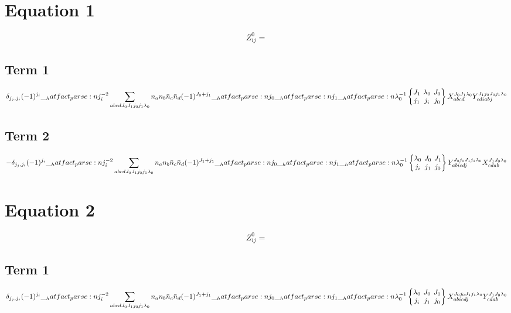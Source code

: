 \documentclass{scrartcl}
\newcommand{\sixj}[6]{\begingroup\setlength{\arraycolsep}{0.2em}\begin{Bmatrix} #1 & #2 & #3 \\ #4 & #5 & #6 \end{Bmatrix}\endgroup}
\begin{document}
\section{Equation 1}
\begin{dmath*}
Z_{i j}^{0} = 
\end{dmath*}
\subsection{Term 1}
\begin{dmath*}
\delta_{{j}_{j},{j}_{i}} \* (-1)^{{j}_{i}} \* \hatfact{{j}_{i}^{-2}} \* \sum_{a b c d {J}_{0} {J}_{1} {j}_{0} {j}_{1} {{\lambda}}_{0}} \* n_{a} \* n_{b} \* \bar{n}_{c} \* \bar{n}_{d} \* (-1)^{{J}_{0}+{j}_{1}} \* \hatfact{{j}_{0}} \* \hatfact{{j}_{1}} \* \hatfact{{{\lambda}}_{0}^{-1}} \* \sixj{{J}_{1}}{{{\lambda}}_{0}}{{J}_{0}}{{j}_{1}}{{j}_{i}}{{j}_{0}} \* X_{a b c d}^{{J}_{0} {J}_{1} {{\lambda}}_{0}} \* Y_{c d i a b j}^{{J}_{1} {j}_{0} {J}_{0} {j}_{1} {{\lambda}}_{0}}
\end{dmath*}
\subsection{Term 2}
\begin{dmath*}
-\delta_{{j}_{j},{j}_{i}} \* (-1)^{{j}_{i}} \* \hatfact{{j}_{i}^{-2}} \* \sum_{a b c d {J}_{0} {J}_{1} {j}_{0} {j}_{1} {{\lambda}}_{0}} \* n_{a} \* n_{b} \* \bar{n}_{c} \* \bar{n}_{d} \* (-1)^{{J}_{1}+{j}_{1}} \* \hatfact{{j}_{0}} \* \hatfact{{j}_{1}} \* \hatfact{{{\lambda}}_{0}^{-1}} \* \sixj{{{\lambda}}_{0}}{{J}_{0}}{{J}_{1}}{{j}_{i}}{{j}_{1}}{{j}_{0}} \* Y_{a b i c d j}^{{J}_{0} {j}_{0} {J}_{1} {j}_{1} {{\lambda}}_{0}} \* X_{c d a b}^{{J}_{1} {J}_{0} {{\lambda}}_{0}}
\end{dmath*}

\section{Equation 2}
\begin{dmath*}
Z_{i j}^{0} = 
\end{dmath*}
\subsection{Term 1}
\begin{dmath*}
\delta_{{j}_{j},{j}_{i}} \* (-1)^{{j}_{i}} \* \hatfact{{j}_{i}^{-2}} \* \sum_{a b c d {J}_{0} {J}_{1} {j}_{0} {j}_{1} {{\lambda}}_{0}} \* n_{a} \* n_{b} \* \bar{n}_{c} \* \bar{n}_{d} \* (-1)^{{J}_{1}+{j}_{1}} \* \hatfact{{j}_{0}} \* \hatfact{{j}_{1}} \* \hatfact{{{\lambda}}_{0}^{-1}} \* \sixj{{{\lambda}}_{0}}{{J}_{0}}{{J}_{1}}{{j}_{i}}{{j}_{1}}{{j}_{0}} \* X_{a b i c d j}^{{J}_{0} {j}_{0} {J}_{1} {j}_{1} {{\lambda}}_{0}} \* Y_{c d a b}^{{J}_{1} {J}_{0} {{\lambda}}_{0}}
\end{dmath*}
\end{document}
